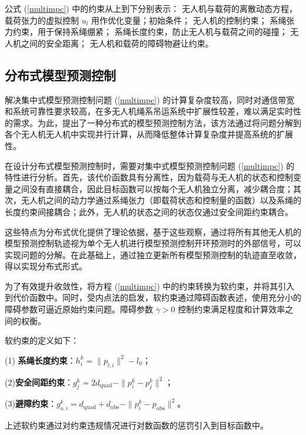 \documentclass[lang=chs, degree=master, blindreview=false, winfonts=true]{yanputhesis}
\begin{document}
公式 (\ref{multimpc}) 中的约束从上到下分别表示：
无人机与载荷的离散动态方程，载荷张力的虚拟控制 \( u_l \) 用作优化变量；初始条件；
无人机的控制约束；
系绳张力约束，用于保持系绳绷紧；
系绳长度约束，防止无人机与载荷之间的碰撞；
无人机之间的安全距离；
无人机和载荷的障碍物避让约束。

\subsection{分布式模型预测控制}
解决集中式模型预测控制问题 (\ref{multimpc}) 的计算复杂度较高，同时对通信带宽和系统可靠性要求较高，在多无人机绳系吊运系统中扩展性较差，难以满足实时性的需求。为此，提出了一种分布式的模型预测控制方法，该方法通过将问题分解到各个无人机无人机中实现并行计算，从而降低整体计算复杂度并提高系统的扩展性。

在设计分布式模型预测控制时，需要对集中式模型预测控制问题 (\ref{multimpc}) 的特性进行分析。首先，该代价函数具有分离性，因为载荷与无人机的状态和控制变量之间没有直接耦合，因此目标函数可以按每个无人机独立分离，减少耦合度；其次，无人机之间的动力学通过系绳张力（即载荷状态和控制量的函数）以及系绳的长度约束间接耦合；此外，无人机的状态之间的状态仅通过安全间距约束耦合。

这些特点为分布式优化提供了理论依据，基于这些观察，通过将所有其他无人机的模型预测控制轨迹视为单个无人机进行模型预测控制开环预测时的外部信号，可以实现问题的分解。在此基础上，通过独立更新所有模型预测控制的轨迹直至收敛，得以实现分布式形式。

为了有效提升收敛性，将方程 (\ref{multimpc}) 中的约束转换为软约束，并将其引入到代价函数中。同时，受内点法的启发，软约束通过障碍函数表述，使用充分小的障碍参数可逼近原始约束问题。障碍参数 $\gamma > 0$ 控制约束满足程度和计算效率之间的权衡。

软约束的定义如下：

    (1) \textbf{系绳长度约束}：$h_i^k = \|p_{l,i}\|^2 - l_0$；

    (2)\textbf{安全间距约束}：$g_j^k = 2d_{\text{quad}} - \|p_i^k - p_j^k\|^2$；

    (3)\textbf{避障约束}：$g_{o,i}^k = d_{\text{quad}} + d_{\text{obs}} - \|p_i^k - p_{\text{obs}}\|^2$。


上述软约束通过对约束违规情况进行对数函数的惩罚引入到目标函数中。
\end{document}
